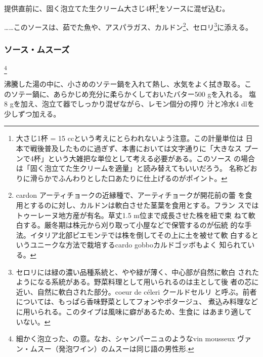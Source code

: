 \begin{recette}
提供直前に、固く泡立てた生クリーム大さじ4杯\footnote{大さじ1杯 = 15
  ccという考えにとらわれないよう注意。この計量単位は
  日本で戦後普及したものに過ぎず、本書においては文字通りに「大きなス
  プーンで4杯」という大雑把な単位として考える必要がある。このソース
  の場合は「固く泡立てた生クリームを適量」と読み替えてもいいだろう。
  名称どおりに滑らかでふんわりとした口あたりに仕上げるのがポイント。}をソースに混ぜ込む。

\ldots{}\ldots{}このソースは、茹でた魚や、アスパラガス、カルドン\footnote{cardon
  アーティチョークの近縁種で、アーティチョークが開花前の蕾
  を食用とするのに対し、カルドンは軟白させた茎葉を食用とする。フラン
  スではトゥーレーヌ地方産が有名。草丈1.5 m位まで成長させた株を紐で束
  ねて軟白する。厳冬期は株元から刈り取って小屋などで保管するのが伝統
  的な手法。イタリア北部ピエモンテでは株を倒してその上に土を被せて軟
  白するというユニークな方法で栽培するcardo gobboカルドゴッボもよく
  知られている。}、セロリ\footnote{セロリには緑の濃い品種系統と、やや緑が薄く、中心部が自然に軟白
  されたようになる系統がある。野菜料理として用いられるのは主として後
  者の芯に近い、自然に軟白された部分。coeur de céleri クールドセルリ
  と呼ぶ。前者については、もっぱら香味野菜としてフォンやポタージュ、
  煮込み料理などに用いられる。このタイプは風味に癖があるため、生食に
  はあまり適していない。}に添える。

\maeaki

\hypertarget{sauce-mousseuse}{%
\subsubsection{ソース・ムスーズ}\label{sauce-mousseuse}}

\footnote{細かく泡立った、の意。なお、シャンパーニュのようなvin
  mousseux ヴァン・ムスー（発泡ワイン）のムスーは同じ語の男性形.}


沸騰した湯の中に、小さめのソテー鍋を入れて熱し、水気をよく拭き取る。こ
のソテー鍋に、あらかじめ充分に柔らかくしておいたバター500 gを入れる。
塩8 gを加え、泡立て器でしっかり混ぜながら、レモン\unquart{}個分の搾り
汁と冷水4 dlを少しずつ加える。


\end{recette}
